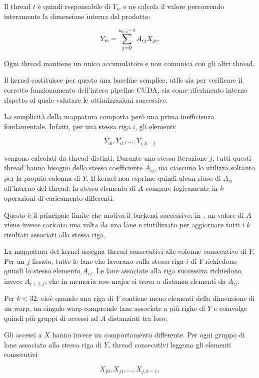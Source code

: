 Il thread $t$ è quindi responsabile di $Y_{ic}$ e ne calcola il valore
percorrendo interamente la dimensione interna del prodotto:

\begin{equation}
    Y_{ic}
    =
    \sum_{j=0}^{n_{\text{loc}}-1}
    A_{ij}X_{jc}.
\end{equation}

Ogni thread mantiene un unico accumulatore e non comunica con gli altri
thread.

Il kernel costituisce per questo una baseline semplice, utile sia
per verificare il corretto funzionamento dell'intera pipeline CUDA, sia
come riferimento interno rispetto al quale valutare le ottimizzazioni
successive.

La semplicità della mappatura comporta però una prima inefficienza
fondamentale. Infatti, per una stessa riga $i$, gli elementi:

\[
Y_{i0},Y_{i1},\ldots,Y_{i,k-1}
\]

vengono calcolati da thread distinti. Durante una stessa iterazione $j$,
tutti questi thread hanno bisogno dello stesso coefficiente $A_{ij}$,
ma ciascuno lo utilizza soltanto per la propria colonna di $Y$.
Il kernel non esprime quindi alcun riuso di $A_{ij}$ all'interno del
thread: lo stesso elemento di $A$ compare logicamente in $k$ operazioni
di caricamento differenti.

Questo è il principale limite che motiva il backend successivo: in
, un valore di $A$ viene invece caricato una volta
da una lane e riutilizzato per aggiornare tutti i $k$ risultati associati
alla stessa riga.

La mappatura del kernel assegna thread consecutivi alle colonne consecutive di
$Y$. Per un $j$ fissato, tutte le lane che lavorano sulla stessa riga $i$ di
$Y$ richiedono quindi lo stesso elemento $A_{ij}$. Le lane associate alla
riga successiva richiedono invece $A_{i+1,j}$, che in memoria row-major si
trova a distanza  elementi da $A_{ij}$.

Per $k<32$, cioè quando una riga di $Y$ contiene meno elementi della
dimensione di un warp, un singolo warp comprende lane associate a più righe
di $Y$ e coinvolge quindi più gruppi di accessi ad $A$ distanziati tra loro.

Gli accessi a $X$ hanno invece un comportamento differente. Per ogni gruppo
di lane associato alla stessa riga di $Y$, thread consecutivi leggono gli
elementi consecutivi

\[
X_{j0}, X_{j1}, \ldots, X_{j,k-1},
\]

